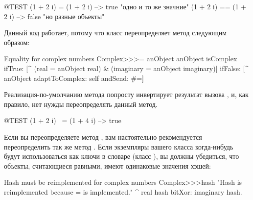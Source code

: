 \documentclass[a4paper,10pt,twoside]{book}
\begin{document}
\begin{code}{@TEST}
(1 + 2 i) = (1 + 2 i)   --> true     "одно и то же значние"
(1 + 2 i) == (1 + 2 i) --> false    "но разные объекты"
\end{code}


Данный код работает, потому что класс  переопределяет метод \ct{=} следующим образом:
\begin{method}{Equality for complex numbers}
Complex>>>= anObject
    anObject isComplex
        ifTrue: [^ (real = anObject real) & (imaginary = anObject imaginary)]
        ifFalse: [^ anObject adaptToComplex: self andSend: #=]
\end{method}

Реализация-по-умолчанию метода  попросту инвертирует результат вызова , и, как правило, нет нужды переопределять данный метод.

\begin{code}{@TEST}
(1 + 2 i) ~= (1 + 4 i) --> true
\end{code}

Если вы переопределяете метод \ct{=}, вам настоятельно рекомендуется переопределить так же метод . Если экземпляры вашего класса когда-нибудь будут использоваться как ключи в словаре (класс ), вы должны убедиться, что объекты, считающиеся равными, имеют одинаковые значения хэшей:
\begin{method}{Hash must be reimplemented for complex numbers}
Complex>>>hash
    "Hash is reimplemented because = is implemented."
    ^ real hash bitXor: imaginary hash.
\end{method}
\end{document}
